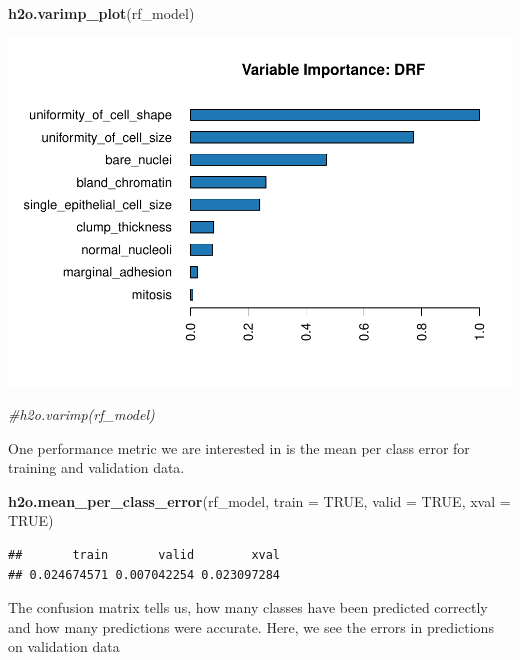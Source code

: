 \documentclass[]{article}
\newenvironment{Shaded}{\begin{snugshade}}{\end{snugshade}}
\newcommand{\KeywordTok}[1]{\textcolor[rgb]{0.13,0.29,0.53}{\textbf{{#1}}}}
\newcommand{\DataTypeTok}[1]{\textcolor[rgb]{0.13,0.29,0.53}{{#1}}}
\newcommand{\CommentTok}[1]{\textcolor[rgb]{0.56,0.35,0.01}{\textit{{#1}}}}
\newcommand{\OtherTok}[1]{\textcolor[rgb]{0.56,0.35,0.01}{{#1}}}
\newcommand{\NormalTok}[1]{{#1}}
\begin{document}
\begin{Shaded}
\begin{Highlighting}[]
\KeywordTok{h2o.varimp_plot}\NormalTok{(rf_model)}
\end{Highlighting}
\end{Shaded}

\includegraphics{webinar_code_files/figure-latex/unnamed-chunk-42-1.pdf}

\begin{Shaded}
\begin{Highlighting}[]
\CommentTok{#h2o.varimp(rf_model)}
\end{Highlighting}
\end{Shaded}

One performance metric we are interested in is the mean per class error
for training and validation data.

\begin{Shaded}
\begin{Highlighting}[]
\KeywordTok{h2o.mean_per_class_error}\NormalTok{(rf_model, }\DataTypeTok{train =} \OtherTok{TRUE}\NormalTok{, }\DataTypeTok{valid =} \OtherTok{TRUE}\NormalTok{, }\DataTypeTok{xval =} \OtherTok{TRUE}\NormalTok{)}
\end{Highlighting}
\end{Shaded}

\begin{verbatim}
##       train       valid        xval 
## 0.024674571 0.007042254 0.023097284
\end{verbatim}

The confusion matrix tells us, how many classes have been predicted
correctly and how many predictions were accurate. Here, we see the
errors in predictions on validation data
\end{document}

